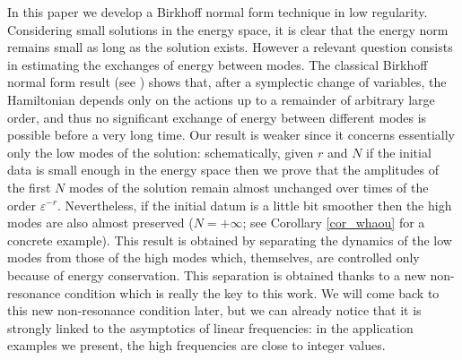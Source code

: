 In this paper we develop a Birkhoff normal form technique in low regularity. Considering small solutions in the energy space, it is clear that the energy norm remains small as long as the solution exists. However a relevant question consists in estimating the exchanges of energy between modes. The classical Birkhoff normal form result (see \cite{Nek77,G}) shows that, after a symplectic change of variables, the Hamiltonian depends only on the actions up to a remainder of arbitrary large order, and thus no significant exchange of energy between different modes is possible before a very long time. Our result is weaker since
it concerns essentially only the low modes of the solution: schematically, given $r$ and $N$ if the initial data is small enough in the energy space then we prove that the amplitudes of the first $N$ modes of the solution remain almost unchanged over times of the order $\varepsilon^{-r}$. Nevertheless, if the initial datum is a little bit smoother then the high modes are also almost preserved (\ie $N=+\infty$; see Corollary \ref{cor_whaou} for a concrete example). This result is obtained by separating the dynamics of the low modes from those of the high modes which, themselves, are controlled only because of energy conservation. This separation is obtained thanks to a new non-resonance condition which is really the key to this work. We will come back to this new non-resonance condition later, but we can already notice that it is strongly linked to the asymptotics of linear frequencies: in the application examples we present, the high frequencies are close to integer values.

